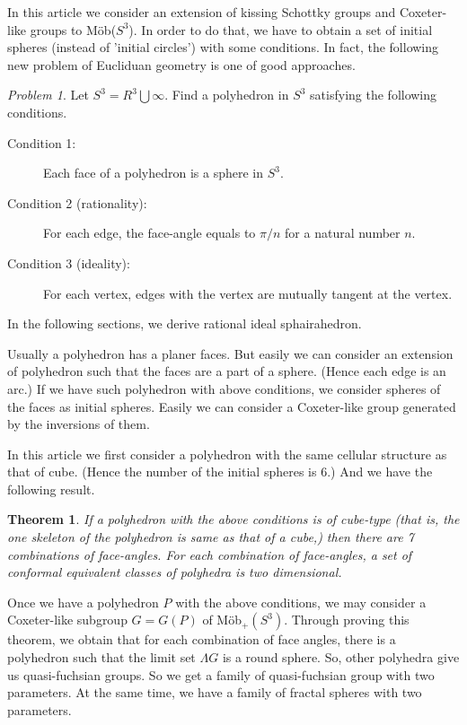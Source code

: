 \documentclass[dvipdfmx]{interact}
\theoremstyle{plain}%
\newtheorem{theorem}{Theorem}[section]
\theoremstyle{definition}
\theoremstyle{remark}
\theoremstyle{problemstyle}
\newtheorem{problem}{Problem}[section] %
\begin{document}
In this article we consider an extension of kissing Schottky groups and
Coxeter-like groups to M\"ob($S^3$). In order to do that, we have to
obtain a set of initial spheres (instead of 'initial circles') with some
conditions. In fact, the following new problem of Eucliduan geometry is
one of good approaches.

\begin{problem}
 Let $S^3 = R^3 \bigcup {\infty}$. Find a polyhedron in $S^3$ satisfying
 the following conditions.
 \begin{description}
  \item[Condition 1:] Each face of a polyhedron is a sphere in $S^3$.
  \item[Condition 2 (rationality):] For each edge, the face-angle equals to $\pi/n$
             for a natural number $n$.
  \item[Condition 3 (ideality):] For each vertex, edges with the vertex are
             mutually tangent at the vertex.
 \end{description}
\end{problem}

In the following sections, we derive rational ideal sphairahedron.

Usually a polyhedron has a planer faces. But easily we can consider an
extension of polyhedron such that the faces are a part of a
sphere. (Hence each edge is an arc.) If we have such polyhedron with
above conditions, we consider spheres of the faces as initial
spheres. Easily we can consider a Coxeter-like group generated by the
inversions of them.

In this article we first consider a polyhedron with the same cellular
structure as that of cube. (Hence the number of the initial spheres is
6.) And we have the following result.

\begin{theorem}
 If a polyhedron with the above conditions is of cube-type (that is,
 the one skeleton of the polyhedron is same as that of a cube,) then
 there are 7 combinations of face-angles. For each combination of
 face-angles, a set of conformal equivalent classes of polyhedra is two
 dimensional.
\end{theorem}

Once we have a polyhedron $P$ with the above conditions, we may consider
a Coxeter-like subgroup $G=G(P)$ of M\"ob$_+(S^3)$. Through proving this
theorem, we obtain that for each combination of face angles, there is a
polyhedron such that the limit set $\Lambda{G}$ is a round sphere. So,
other polyhedra give us quasi-fuchsian groups. So we get a family of
quasi-fuchsian group with two parameters. At the same time, we have a
family of fractal spheres with two parameters.
\end{document}
